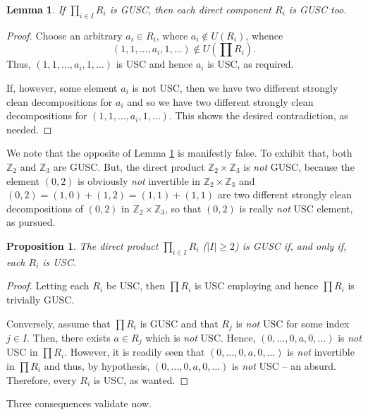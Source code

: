 \documentclass[12pt]{amsart}
\newtheorem{proposition}[theorem]{Proposition}
\newtheorem{lemma}[theorem]{Lemma}
\theoremstyle{definition}
\begin{document}
\begin{lemma}\label{lem2.3}
If $\displaystyle\prod_{i \in I} R_i$ is GUSC, then each direct component $R_i$ is GUSC too.
\end{lemma}

\begin{proof}
Choose an arbitrary $a_{i}\in R_{i}$, where $a_{i}\not\in U(R_{i})$, whence $$(1,1,\ldots , a_{i}, 1, \ldots )\not\in U(\prod R_{i}).$$ Thus, $(1,1,\ldots ,a_{i},1,\ldots )$ is USC and hence $a_{i}$ is USC, as required.

If, however, some element $a_{i}$ is not USC, then we have two different strongly clean decompositions for $a_{i}$ and so we have two different strongly clean decompositions for $(1,1,\ldots ,a_{i},1,\ldots )$. This shows the desired contradiction, as needed.
\end{proof}

We note that the opposite of Lemma \ref{lem2.3} is manifestly false. To exhibit that, both $\mathbb{Z}_{2}$ and $\mathbb{Z}_{3}$ are GUSC. But, the direct product $\mathbb{Z}_2 \times \mathbb{Z}_3$ is {\it not} GUSC, because the element $(0,2)$ is obviously {\it not} invertible in $\mathbb{Z}_2 \times \mathbb{Z}_3$ and $(0,2)=(1,0)+(1,2)=(1,1)+(1,1)$ are two different strongly clean decompositions of $(0,2)$ in $\mathbb{Z}_2 \times \mathbb{Z}_3$, so that $(0,2)$ is really {\it not} USC element, as pursued.

\begin{proposition}\label{prop2.5}
The direct product $\displaystyle\prod_{i\in I} R_i$ ($|I| \geq 2$) is GUSC if, and only if, each $R_i$ is USC.
\end{proposition}

\begin{proof}
Letting each $R_{i}$ be USC, then $\prod R_{i}$ is USC employing \cite[Example 2]{2} and hence $\prod R_{i}$ is trivially GUSC.

Conversely, assume that $\prod R_{i}$ is GUSC and that $R_{j}$ is {\it not} USC for some index $j\in I$. Then, there exists $a\in R_{j}$ which is {\it not} USC. Hence, $(0,\ldots ,0,a,0,\ldots )$ is {\it not} USC in $\prod R_{i}$. However, it is readily seen that $(0,\ldots ,0,a,0,\ldots )$ is {\it not} invertible in $\prod R_{i}$ and thus, by hypothesis, $(0,\ldots ,0,a,0,\ldots )$ is {\it not} USC -- an absurd. Therefore, every $R_{i}$ is USC, as wanted.
\end{proof}

Three consequences validate now.
\end{document}
